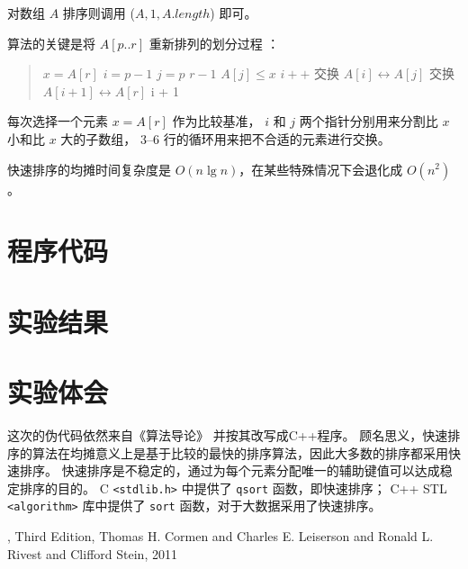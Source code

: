 \documentclass[cs4size,a4paper,nofonts]{ctexart}
\begin{document}
对数组 $A$ 排序则调用 ($A, 1, A.length$) 即可。

算法的关键是将 $A[p..r]$ 重新排列的划分过程 ：
\begin{quote}
\begin{codebox}
\li $x = A[r]$
\li $i = p - 1$
\li \For $j = p$ \To $r - 1$ \Do
\li   \If $A[j] \le x$ \Then
\li     $i++$
\li     交换 $A[i] \leftrightarrow A[j]$
       \End
     \End
\li 交换 $A[i + 1] \leftrightarrow A[r]$
\li \Return i + 1
\end{codebox}
\end{quote}


 每次选择一个元素 $x = A[r]$ 作为比较基准，
$i$ 和 $j$ 两个指针分别用来分割比 $x$ 小和比 $x$ 大的子数组，
3--6 行的循环用来把不合适的元素进行交换。


快速排序的均摊时间复杂度是 $O(n\lg n)$，在某些特殊情况下会退化成 $O(n^2)$。

\section{程序代码}
{\linespread{1}}

\section{实验结果}
\begin{quote}

\end{quote}

\section{实验体会}

这次的伪代码依然来自《算法导论》\cite{clrs} 并按其改写成C++程序。
顾名思义，快速排序的算法在均摊意义上是基于比较的最快的排序算法，因此大多数的排序都采用快速排序。
快速排序是不稳定的，通过为每个元素分配唯一的辅助键值可以达成稳定排序的目的。
C \verb|<stdlib.h>| 中提供了 \verb|qsort| 函数，即快速排序；
C++ STL \verb|<algorithm>| 库中提供了 \verb|sort| 函数，对于大数据采用了快速排序。

\begin{thebibliography}{10}
, Third Edition, Thomas H. Cormen and Charles E. Leiserson and Ronald L. Rivest and Clifford Stein, 2011
\end{thebibliography}
\end{document}
